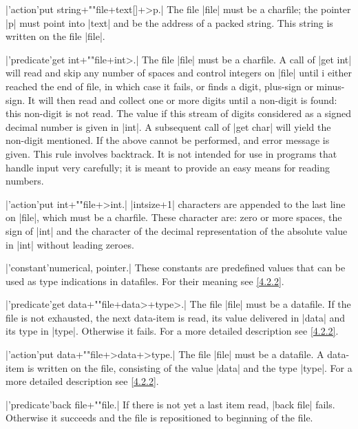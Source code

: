 \documentclass{article}
\begin{document}
\X\pp|'action'put string+""file+text[]+>p.|\Y
The file \pp|file| must be a charfile; the pointer \pp|p| must point into
\pp|text| and be the address of a packed string. This string is written on
the file \pp|file|.

\X\pp|'predicate'get int+""file+int>.|\Y
The file \pp|file| must be a charfile. A call of \pp|get int| will read and
skip any number of spaces and control integers on \pp|file| until i either
reached the end of file, in which case it fails, or finds a digit, plus-sign
or minus-sign. It will then read and collect one or more digits until a
non-digit is found: this non-digit is not read. The value if this stream of
digits considered as a signed decimal number is given in \pp|int|.
A subsequent call of \pp|get char| will yield the non-digit mentioned. If
the above cannot be performed, and error message is given.
This rule involves backtrack. It is not intended for use in programs that
handle input very carefully; it is meant to provide an easy means for
reading numbers.

\X\pp|'action'put int+""file+>int.|\Y
\pp|intsize+1| characters are appended to the last line on \pp|file|, which
must be a charfile. These character are: zero or more spaces, the sign of
\pp|int| and the character of the decimal representation of the absolute
value in \pp|int| without leading zeroes.

\X\pp|'constant'numerical, pointer.|\Y
These constants are predefined values that can be used as type indications
in datafiles. For their meaning see \ref{4.2.2}.

\X\pp|'predicate'get data+""file+data>+type>.|\Y
The file \pp|file| must be a datafile. If the file is not exhausted, the
next data-item is read, its value delivered in \pp|data| and its type in
\pp|type|. Otherwise it fails. For a more detailed description see
\ref{4.2.2}.

\X\pp|'action'put data+""file+>data+>type.|\Y
The file \pp|file| must be a datafile. A data-item is written on the file,
consisting of the value \pp|data| and the type \pp|type|. For a more
detailed description see \ref{4.2.2}.


\X\pp|'predicate'back file+""file.|\Y
If there is not yet a last item read, \pp|back file| fails. Otherwise it
succeeds and the file is repositioned to
beginning of the file.

\end{document}
